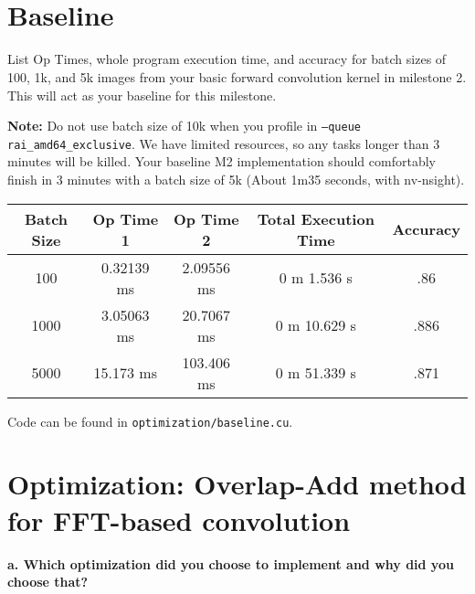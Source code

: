 \documentclass[12pt]{article}
\begin{document}

\\
\\

\section*{Baseline}

List Op Times, whole program execution time, and accuracy for batch sizes of 100, 1k, and 5k images from your basic forward convolution kernel in milestone 2. This will act as your baseline for this milestone.

\textbf{Note:} Do not use batch size of 10k when you profile in \texttt{--queue rai\_amd64\_exclusive}. We have limited resources, so any tasks longer than 3 minutes will be killed. Your baseline M2 implementation should comfortably finish in 3 minutes with a batch size of 5k (About 1m35 seconds, with nv-nsight).

\begin{table}[!ht]
\begin{longtable}{c|cccc} \toprule
Batch Size & Op Time 1 & Op Time 2 & Total Execution Time & Accuracy \\ \midrule
100  & 0.32139 ms & 2.09556 ms & 0 m 1.536 s & .86 \\
1000 & 3.05063 ms & 20.7067 ms & 0 m 10.629 s & .886 \\
5000 & 15.173 ms & 103.406 ms & 0 m 51.339 s & .871 \\
\bottomrule
\end{longtable}
\end{table}

Code can be found in \texttt{optimization/baseline.cu}.

\clearpage

\section{Optimization: Overlap-Add method for FFT-based convolution}

\hfill\break
\noindent \textbf{a. \; Which optimization did you choose to implement and why did you choose that?}
\hfill\break
\end{document}
